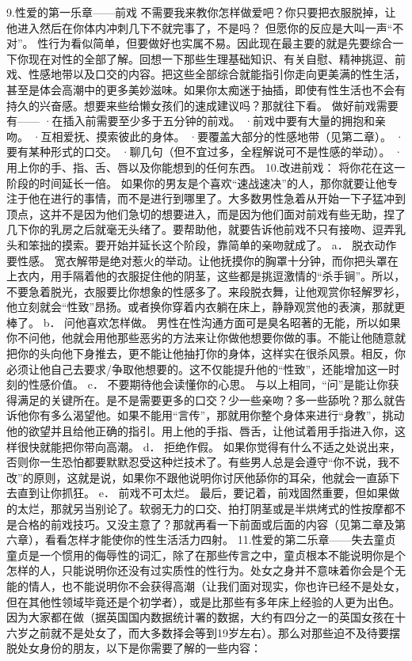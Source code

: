 \documentclass[12pt,UTF8]{ctexbook}
\begin{document}
9.性爱的第一乐章——前戏
不需要我来教你怎样做爱吧？你只要把衣服脱掉，让他进入然后在你体内冲刺几下不就完事了，不是吗？
但愿你的反应是大叫一声“不对”。
性行为看似简单，但要做好也实属不易。因此现在最主要的就是先要综合一下你现在对性的全部了解。回想一下那些生理基础知识、有关自慰、精神挑逗、前戏、性感地带以及口交的内容。把这些全部综合就能指引你走向更美满的性生活，甚至是体会高潮中的更多美妙滋味。如果你太痴迷于抽插，即使有性生活也不会有持久的兴奋感。想要来些给懒女孩们的速成建议吗？那就往下看。
做好前戏需要有——
·在插入前需要至少多于五分钟的前戏。
·前戏中要有大量的拥抱和亲吻。
·互相爱抚、摸索彼此的身体。
·要覆盖大部分的性感地带（见第二章）。
·要有某种形式的口交。
·聊几句（但不宜过多，全程解说可不是性感的举动）。
·用上你的手、指、舌、唇以及你能想到的任何东西。
10.改进前戏：
将你花在这一阶段的时间延长一倍。
如果你的男友是个喜欢“速战速决”的人，那你就要让他专注于他在进行的事情，而不是进行到哪里了。大多数男性急着从开始一下子猛冲到顶点，这并不是因为他们急切的想要进入，而是因为他们面对前戏有些无助，捏了几下你的乳房之后就毫无头绪了。要帮助他，就要告诉他前戏不只有接吻、逗弄乳头和笨拙的摸索。要开始并延长这个阶段，靠简单的亲吻就成了。
a． 脱衣动作要性感。
宽衣解带是绝对惹火的举动。让他抚摸你的胸罩十分钟，而你把头罩在上衣内，用手隔着他的衣服捉住他的阴茎，这些都是挑逗激情的“杀手锏”。所以，不要急着脱光，衣服要比你想象的性感多了。来段脱衣舞，让他观赏你轻解罗衫，他立刻就会“性致”昂扬。或者换你穿着内衣躺在床上，静静观赏他的表演，那就更棒了。
b． 问他喜欢怎样做。
男性在性沟通方面可是臭名昭著的无能，所以如果你不问他，他就会用他那些恶劣的方法来让你做他想要你做的事。不能让他随意就把你的头向他下身推去，更不能让他抽打你的身体，这样实在很杀风景。相反，你必须让他自己去要求/争取他想要的。这不仅能提升他的“性致”，还能增加这一时刻的性感价值。
c． 不要期待他会读懂你的心思。
与以上相同，“问”是能让你获得满足的关键所在。是不是需要更多的口交？少一些亲吻？多一些舔吮？那么就告诉他你有多么渴望他。如果不能用“言传”，那就用你整个身体来进行“身教”，挑动他的欲望并且给他正确的指引。用上他的手指、唇舌，让他试着用手指进入你，这样很快就能把你带向高潮。
d． 拒绝作假。
如果你觉得有什么不适之处说出来，否则你一生恐怕都要默默忍受这种烂技术了。有些男人总是会遵守“你不说，我不改”的原则，这就是说，如果你不跟他说明你讨厌他舔你的耳朵，他就会一直舔下去直到让你抓狂。
e． 前戏不可太烂。
最后，要记着，前戏固然重要，但如果做的太烂，那就另当别论了。软弱无力的口交、拍打阴茎或是半烘烤式的性按摩都不是合格的前戏技巧。又没主意了？那就再看一下前面或后面的内容（见第二章及第六章），看看怎样才能使你的性生活活力四射。
11.性爱的第二乐章——失去童贞
童贞是一个惯用的侮辱性的词汇，除了在那些传言之中，童贞根本不能说明你是个怎样的人，只能说明你还没有过实质性的性行为。处女之身并不意味着你会是个无能的情人，也不能说明你不会获得高潮（让我们面对现实，你也许已经不是处女，但在其他性领域毕竟还是个初学者），或是比那些有多年床上经验的人更为出色。因为大家都在做（据英国国内数据统计署的数据，大约有四分之一的英国女孩在十六岁之前就不是处女了，而大多数择会等到19岁左右）。那么对那些迫不及待要摆脱处女身份的朋友，以下是你需要了解的一些内容：
\end{document}
